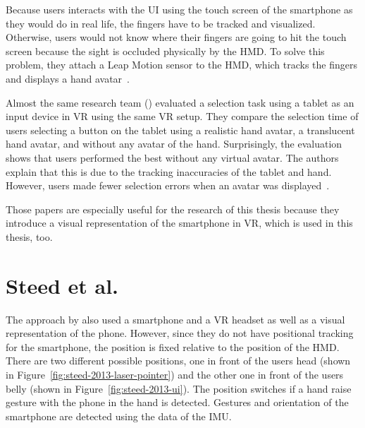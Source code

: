 Because users interacts with the \gls{UI} using the touch screen of the smartphone as they would do in real life, the fingers have to be tracked and visualized. Otherwise, users would not know where their fingers are going to hit the touch screen because the sight is occluded physically by the \gls{HMD}. To solve this problem, they attach a Leap Motion sensor to the \gls{HMD}, which tracks the fingers and displays a hand avatar~\cite{Dias.2018}.

Almost the same research team (\citeauthor{Afonso.2017}) evaluated a selection task using a tablet as an input device in \gls{VR} using the same \gls{VR} setup. They compare the selection time of users selecting a button on the tablet using a realistic hand avatar, a translucent hand avatar, and without any avatar of the hand. Surprisingly, the evaluation shows that users performed the best without any virtual avatar. The authors explain that this is due to the tracking inaccuracies of the tablet and hand. However, users made fewer selection errors when an avatar was displayed~\cite[247-248]{Afonso.2017}.

Those papers are especially useful for the research of this thesis because they introduce a visual representation of the smartphone in \gls{VR}, which is used in this thesis, too. 


\section{Steed et al.}\label{section:steed-2013}
The approach by \citeauthor{Steed.2013} also used a smartphone and a \gls{VR} headset as well as a visual representation of the phone. However, since they do not have positional tracking for the smartphone, the position is fixed relative to the position of the \gls{HMD}. There are two different possible positions, one in front of the users head (shown in Figure~\ref{fig:steed-2013-laser-pointer}) and the other one in front of the users belly (shown in Figure~\ref{fig:steed-2013-ui}). The position switches if a hand raise gesture with the phone in the hand is detected. Gestures and orientation of the smartphone are detected using the data of the \gls{IMU}.

